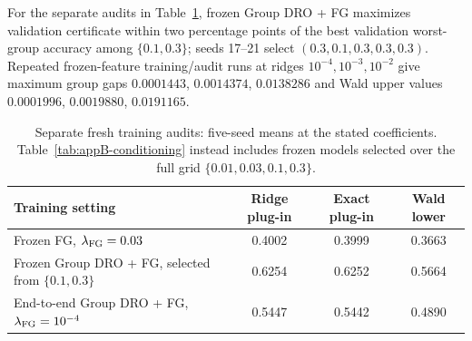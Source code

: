 For the separate audits in Table~\ref{tab:appB-training}, frozen Group DRO + FG maximizes validation certificate within two percentage points of the best validation worst-group accuracy among $\{0.1,0.3\}$; seeds 17--21 select $(0.3,0.1,0.3,0.3,0.3)$. Repeated frozen-feature training/audit runs at ridges $10^{-4},10^{-3},10^{-2}$ give maximum group gaps $0.0001443$, $0.0014374$, $0.0138286$ and Wald upper values $0.0001996$, $0.0019880$, $0.0191165$.

\begin{table}[H]
\centering\small
\caption{Separate fresh training audits: five-seed means at the stated coefficients. Table~\ref{tab:appB-conditioning} instead includes frozen models selected over the full grid $\{0.01,0.03,0.1,0.3\}$.}
\label{tab:appB-training}
\begin{tabular}{@{}>{\raggedright\arraybackslash}p{.49\linewidth}ccc@{}}
\toprule
Training setting & Ridge plug-in & Exact plug-in & Wald lower\\
\midrule
Frozen FG, $\lambda_{\mathrm{FG}}=0.03$ & 0.4002 & 0.3999 & 0.3663\\
Frozen Group DRO + FG, selected from $\{0.1,0.3\}$ & 0.6254 & 0.6252 & 0.5664\\
End-to-end Group DRO + FG, $\lambda_{\mathrm{FG}}=10^{-4}$ & 0.5447 & 0.5442 & 0.4890\\
\bottomrule
\end{tabular}
\end{table}
